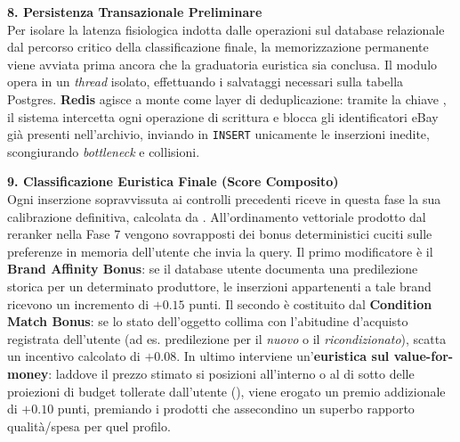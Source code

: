 \vspace{0.4cm}
\noindent
\textbf{8. Persistenza Transazionale Preliminare}\\
Per isolare la latenza fisiologica indotta dalle operazioni sul
database relazionale dal percorso critico della classificazione
finale, la memorizzazione permanente viene avviata prima ancora
che la graduatoria euristica sia conclusa.
Il modulo  opera in un \textit{thread}
isolato, effettuando i salvataggi necessari sulla tabella Postgres.
\textbf{Redis} agisce a monte come layer di deduplicazione: tramite
la chiave , il sistema intercetta ogni
operazione di scrittura e blocca gli identificatori eBay già
presenti nell'archivio, inviando in \texttt{INSERT} unicamente le
inserzioni inedite, scongiurando \textit{bottleneck} e collisioni.

\vspace{0.4cm}
\noindent
\textbf{9. Classificazione Euristica Finale (Score Composito)}\\
Ogni inserzione sopravvissuta ai controlli precedenti riceve in
questa fase la sua calibrazione definitiva, calcolata da
. All'ordinamento vettoriale prodotto
dal reranker nella Fase 7 vengono sovrapposti dei bonus deterministici 
cuciti sulle preferenze in memoria dell'utente che invia la query.
Il primo modificatore è il \textbf{Brand Affinity Bonus}: se il
database utente documenta una predilezione storica per un
determinato produttore, le inserzioni appartenenti a tale brand
ricevono un incremento di \(+0.15\) punti. Il secondo è costituito
dal \textbf{Condition Match Bonus}: se lo stato dell'oggetto 
collima con l'abitudine d'acquisto registrata dell'utente (ad es. predilezione per il \emph{nuovo} 
o il \emph{ricondizionato}), scatta un incentivo calcolato di \(+0.08\). In ultimo interviene 
un'\textbf{euristica sul value-for-money}: laddove il prezzo stimato si posizioni all'interno
o al di sotto delle proiezioni di budget tollerate dall'utente 
(), viene erogato un premio addizionale di \(+0.10\) punti, 
premiando i prodotti che assecondino un superbo rapporto qualità/spesa per quel profilo.

